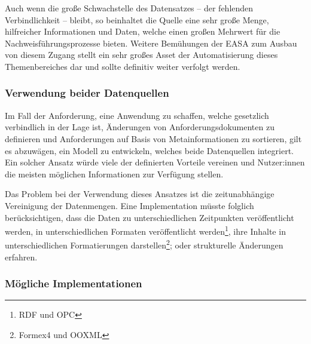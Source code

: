    \medskip
    Auch wenn die große Schwachstelle des Datensatzes -- der fehlenden Verbindlichkeit -- bleibt, so beinhaltet die Quelle eine sehr große Menge, hilfreicher Informationen und Daten, welche einen großen Mehrwert für die Nachweisführungsprozesse bieten.
    Weitere Bemühungen der \ac{EASA} zum Ausbau von diesem Zugang stellt ein sehr großes Asset der Automatisierung dieses Themenbereiches dar und sollte definitiv weiter verfolgt werden.       
    
\subsubsection{Verwendung beider Datenquellen}

    Im Fall der Anforderung, eine Anwendung zu schaffen, welche gesetzlich verbindlich in der Lage ist, Änderungen von Anforderungsdokumenten zu definieren und Anforderungen auf Basis von Metainformationen zu sortieren, gilt es abzuwägen, ein Modell zu entwickeln, welches beide Datenquellen integriert.
    Ein solcher Ansatz würde viele der definierten Vorteile vereinen und Nutzer:innen die meisten möglichen Informationen zur Verfügung stellen.
    
    \medskip
    Das Problem bei der Verwendung dieses Ansatzes ist die zeitunabhängige Vereinigung der Datenmengen.
    Eine Implementation müsste folglich berücksichtigen, dass die Daten zu unterschiedlichen Zeitpunkten veröffentlicht werden, in unterschiedlichen Formaten veröffentlicht werden\footnote{\ac{RDF} und \ac{OPC}}, ihre Inhalte in unterschiedlichen Formatierungen darstellen\footnote{Formex4 und \ac{OOXML}}; oder strukturelle Änderungen erfahren.

\pagebreak
\subsubsection{Mögliche Implementationen}
    
